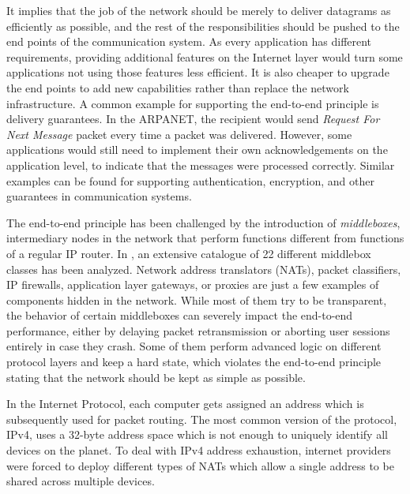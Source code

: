 It implies that the job of the network should be merely to deliver datagrams as efficiently as possible, and the rest of the responsibilities should be pushed to the end points of the communication system. As every application has different requirements, providing additional features on the Internet layer would turn some applications not using those features less efficient. It is also cheaper to upgrade the end points to add new capabilities rather than replace the network infrastructure. A common example for supporting the end-to-end principle is delivery guarantees. In the ARPANET, the recipient would send \textit{Request For Next Message} packet every time a packet was delivered. However, some applications would still need to implement their own acknowledgements on the application level, to indicate that the messages were processed correctly. Similar examples can be found for supporting authentication, encryption, and other guarantees in communication systems.

The end-to-end principle has been challenged by the introduction of \textit{middleboxes}, intermediary nodes in the network that perform functions different from functions of a regular IP router. In \cite{rfc3234}, an extensive catalogue of 22 different middlebox classes has been analyzed. Network address translators (NATs), packet classifiers, IP firewalls, application layer gateways, or proxies are just a few examples of components hidden in the network. While most of them try to be transparent, the behavior of certain middleboxes can severely impact the end-to-end performance, either by delaying packet retransmission or aborting user sessions entirely in case they crash. Some of them perform advanced logic on different protocol layers and keep a hard state, which violates the end-to-end principle stating that the network should be kept as simple as possible.


In the Internet Protocol, each computer gets assigned an address which is subsequently used for packet routing. The most common version of the protocol, IPv4, uses a 32-byte address space which is not enough to uniquely identify all devices on the planet. To deal with IPv4 address exhaustion, internet providers were forced to deploy different types of NATs which allow a single address to be shared across multiple devices.

